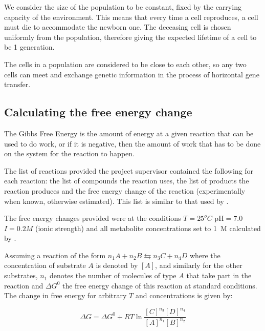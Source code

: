 \documentclass[a4paper,12pt]{article}
\begin{document}
	We consider the size of the population to be constant, fixed by the carrying capacity of the environment. This means that every time a cell reproduces, a cell must die to accommodate the newborn one. The deceasing cell is chosen uniformly from the population, therefore giving the expected lifetime of a cell to be 1 generation.

	The cells in a population are considered to be close to each other, so  any two cells can meet and exchange genetic information in the process of horizontal gene transfer.

\subsection{Calculating the free energy change}
\label{sub:The free energy change}

	The Gibbs Free Energy is the amount of energy at a given reaction that can be used to do work, or if it is negative, then the amount of work that has to be done on the system for the reaction to happen. 


	The list of reactions provided the project supervisor contained the following for each reaction: the list of compounds the reaction uses, the list of products the reaction produces and the free energy change of the reaction (experimentally when known, otherwise estimated). This list is similar to that used by \cite{BartekLower}.
	
	The free energy changes provided were at the conditions $T=25  ^o C$ pH$=7.0$ $I=0.2 M$ (ionic strength) and all metabolite concentrations set to 1~M calculated by \cite{BartekLower}. 
	
	Assuming a reaction of the form $n_1A + n_2B \leftrightarrows n_3C + n_4D$ where the concentration of substrate $A$ is denoted by $[A]$, and similarly for the other substrates, $n_1$ denotes the number of molecules of type $A$ that take part in the reaction and  $\Delta G^0$  the free energy change of this reaction at standard conditions. The change in free energy for arbitrary $T$ and concentrations is given by: 
	
	\begin{equation}\label{eq:freeechange}
		\Delta G = \Delta G^0 + R T \ln \frac{[C]^{n_3}[D]^{n_4}}{[A]^{n_1}[B]^{n_2}}
	\end{equation}
	
\end{document}
